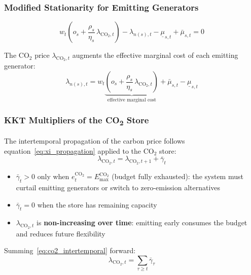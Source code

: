 \documentclass{article}
\begin{document}
\subsubsection{Modified Stationarity for Emitting Generators}

\begin{equation}
    \boxed{
        w_t \left( o_s + \frac{\rho_s}{\eta_s}\, \lambda_{\text{CO}_2,t} \right)
        - \lambda_{n(s),t}
        - \underline{\mu}_{s,t} + \bar{\mu}_{s,t} = 0
    }
    \label{eq:stat_co2gen}
\end{equation}

The CO$_2$ price $\lambda_{\text{CO}_2,t}$ augments the effective marginal cost
of each emitting generator:
\begin{equation}
    \lambda_{n(s),t} = w_t
    \underbrace{\left( o_s + \frac{\rho_s}{\eta_s}\,
    \lambda_{\text{CO}_2,t} \right)}_{\text{effective marginal cost}}
    + \bar{\mu}_{s,t} - \underline{\mu}_{s,t}
    \label{eq:lmp_co2}
\end{equation}

\subsubsection{KKT Multipliers of the CO\textsubscript{2} Store}

The intertemporal propagation of the carbon price follows
equation~\eqref{eq:xi_propagation} applied to the CO$_2$ store:
\begin{equation}
    \lambda_{\text{CO}_2, t} = \lambda_{\text{CO}_2, t+1} + \bar{\gamma}_t
    \label{eq:co2_intertemporal}
\end{equation}

\begin{itemize}
    \item $\bar{\gamma}_t > 0$ only when $e^{\text{CO}_2}_t = E^{\text{CO}_2}_{\max}$
          (budget fully exhausted): the system must curtail emitting generators
          or switch to zero-emission alternatives
    \item $\bar{\gamma}_t = 0$ when the store has remaining capacity
    \item $\lambda_{\text{CO}_2, t}$ is \textbf{non-increasing over time}: emitting
          early consumes the budget and reduces future flexibility
\end{itemize}

Summing~\eqref{eq:co2_intertemporal} forward:
\begin{equation}
    \lambda_{\text{CO}_2, t} = \sum_{\tau \ge t} \bar{\gamma}_\tau
    \label{eq:co2_price_decomp}
\end{equation}
\end{document}
